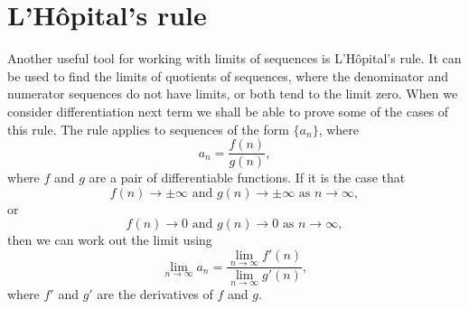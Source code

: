 \documentclass[extrafontsizes, twoside, a4paper]{memoir}
\theoremstyle{plain}%
\theoremstyle{definition}
\theoremstyle{remark}
\begin{document}
\section{L'H\^{o}pital's rule}
Another useful tool for working with limits of sequences is L'H\^{o}pital's rule. It can be used to find the limits of quotients of sequences, where the denominator and numerator sequences do not have limits, or both tend to the limit zero. When we consider differentiation next term we shall be able to prove some of the cases of this rule. The rule applies to sequences of the form $\{ a_n \}$, where
$$a_n = \frac{f(n)}{g(n)},$$
where $f$ and $g$ are a pair of differentiable functions. If it is the case that
$$ f(n) \to \pm \infty \text{ and } g(n) \to \pm \infty \text{ as } n \to \infty,$$
or
$$f(n) \to 0 \text{ and } g(n) \to 0 \text{ as } n \to \infty ,$$
then we can work out the limit using
$$\lim_{n \to \infty} a_n = \frac{\lim\limits_{n \to \infty} f'(n)}{\lim\limits_{n \to \infty} g'(n)},$$
where $f'$ and $g'$ are the derivatives of $f$ and $g$.
\end{document}
